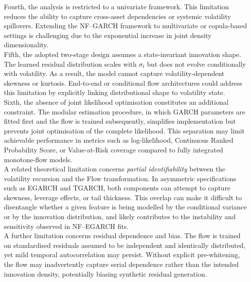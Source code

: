 \documentclass[oneside,12pt]{CUEDthesisPSnPDF}
\begin{document}
\medskip
\noindent
Fourth, the analysis is restricted to a univariate framework. This limitation reduces the ability to capture cross-asset dependencies or systemic volatility spillovers. Extending the NF–GARCH framework to multivariate or copula-based settings is challenging due to the exponential increase in joint density dimensionality.\\

\medskip
\noindent
Fifth, the adopted two-stage design assumes a state-invariant innovation shape. The learned residual distribution scales with $\sigma_t$ but does not evolve conditionally with volatility. As a result, the model cannot capture volatility-dependent skewness or kurtosis. End-to-end or conditional flow architectures could address this limitation by explicitly linking distributional shape to volatility state.\\

\medskip
\noindent
Sixth, the absence of joint likelihood optimisation constitutes an additional constraint. The modular estimation procedure, in which GARCH parameters are fitted first and the flow is trained subsequently, simplifies implementation but prevents joint optimisation of the complete likelihood. This separation may limit achievable performance in metrics such as log-likelihood, Continuous Ranked Probability Score, or Value-at-Risk coverage compared to fully integrated monotone-flow models.\\

\medskip
\noindent
A related theoretical limitation concerns \emph{partial identifiability} between the volatility recursion and the Flow transformation. In asymmetric specifications such as EGARCH and TGARCH, both components can attempt to capture skewness, leverage effects, or tail thickness. This overlap can make it difficult to disentangle whether a given feature is being modelled by the conditional variance or by the innovation distribution, and likely contributes to the instability and sensitivity observed in NF–EGARCH fits.\\

\medskip
\noindent
A further limitation concerns residual dependence and bias. The flow is trained on standardised residuals assumed to be independent and identically distributed, yet mild temporal autocorrelation may persist. Without explicit pre-whitening, the flow may inadvertently capture serial dependence rather than the intended innovation density, potentially biasing synthetic residual generation.\\
\end{document}
